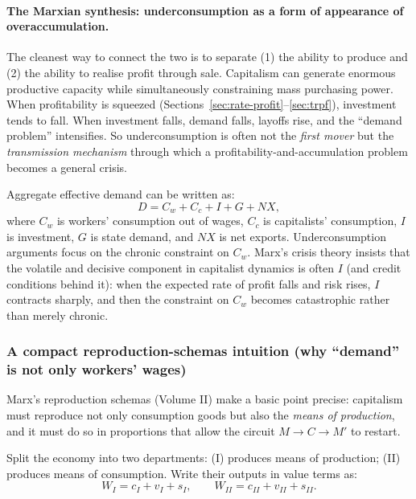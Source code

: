 \paragraph{The Marxian synthesis: underconsumption as a form of appearance of overaccumulation.}
The cleanest way to connect the two is to separate (1) the ability to produce and (2) the
ability to realise profit through sale.
Capitalism can generate enormous productive capacity while simultaneously constraining
mass purchasing power.
When profitability is squeezed (Sections~\ref{sec:rate-profit}--\ref{sec:trpf}),
investment tends to fall.
When investment falls, demand falls, layoffs rise, and the “demand problem” intensifies.
So underconsumption is often not the \emph{first mover} but the \emph{transmission mechanism}
through which a profitability-and-accumulation problem becomes a general crisis.

Aggregate effective demand can be written as:
\[
D = C_w + C_c + I + G + NX,
\]
where $C_w$ is workers’ consumption out of wages, $C_c$ is capitalists’ consumption,
$I$ is investment, $G$ is state demand, and $NX$ is net exports.
Underconsumption arguments focus on the chronic constraint on $C_w$.
Marx’s crisis theory insists that the volatile and decisive component in capitalist dynamics is
often $I$ (and credit conditions behind it): when the expected rate of profit falls and risk rises,
$I$ contracts sharply, and then the constraint on $C_w$ becomes catastrophic rather than merely chronic.\cite{Shaikh2016}

\subsubsection*{A compact reproduction-schemas intuition (why “demand” is not only workers’ wages)}

Marx’s reproduction schemas (Volume II) make a basic point precise: capitalism must reproduce
not only consumption goods but also the \emph{means of production}, and it must do so in
proportions that allow the circuit \(M \rightarrow C \rightarrow M'\) to restart.


Split the economy into two departments:
(I) produces means of production; (II) produces means of consumption.
Write their outputs in value terms as:
\[
  W_I = c_I + v_I + s_I,
  \qquad
  W_{II} = c_{II} + v_{II} + s_{II}.
\]

